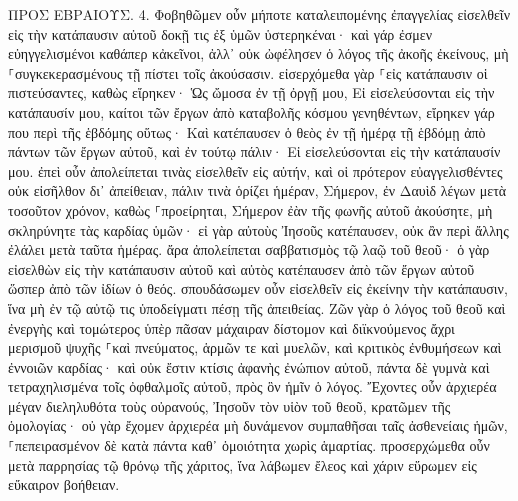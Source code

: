 \documentclass[twoside, 9pt]{extreport}
\begin{document}
ΠΡΟΣ ΕΒΡΑΙΟΥΣ.
4.
Φοβηθῶμεν οὖν μήποτε καταλειπομένης ἐπαγγελίας εἰσελθεῖν εἰς τὴν κατάπαυσιν αὐτοῦ δοκῇ τις ἐξ ὑμῶν ὑστερηκέναι· 
καὶ γάρ ἐσμεν εὐηγγελισμένοι καθάπερ κἀκεῖνοι, ἀλλ᾽ οὐκ ὠφέλησεν ὁ λόγος τῆς ἀκοῆς ἐκείνους, μὴ ⸀συγκεκερασμένους τῇ πίστει τοῖς ἀκούσασιν. 
εἰσερχόμεθα γὰρ ⸀εἰς κατάπαυσιν οἱ πιστεύσαντες, καθὼς εἴρηκεν· Ὡς ὤμοσα ἐν τῇ ὀργῇ μου, Εἰ εἰσελεύσονται εἰς τὴν κατάπαυσίν μου, καίτοι τῶν ἔργων ἀπὸ καταβολῆς κόσμου γενηθέντων, 
εἴρηκεν γάρ που περὶ τῆς ἑβδόμης οὕτως· Καὶ κατέπαυσεν ὁ θεὸς ἐν τῇ ἡμέρᾳ τῇ ἑβδόμῃ ἀπὸ πάντων τῶν ἔργων αὐτοῦ, 
καὶ ἐν τούτῳ πάλιν· Εἰ εἰσελεύσονται εἰς τὴν κατάπαυσίν μου. 
ἐπεὶ οὖν ἀπολείπεται τινὰς εἰσελθεῖν εἰς αὐτήν, καὶ οἱ πρότερον εὐαγγελισθέντες οὐκ εἰσῆλθον δι᾽ ἀπείθειαν, 
πάλιν τινὰ ὁρίζει ἡμέραν, Σήμερον, ἐν Δαυὶδ λέγων μετὰ τοσοῦτον χρόνον, καθὼς ⸀προείρηται, Σήμερον ἐὰν τῆς φωνῆς αὐτοῦ ἀκούσητε, μὴ σκληρύνητε τὰς καρδίας ὑμῶν· 
εἰ γὰρ αὐτοὺς Ἰησοῦς κατέπαυσεν, οὐκ ἂν περὶ ἄλλης ἐλάλει μετὰ ταῦτα ἡμέρας. 
ἄρα ἀπολείπεται σαββατισμὸς τῷ λαῷ τοῦ θεοῦ· 
ὁ γὰρ εἰσελθὼν εἰς τὴν κατάπαυσιν αὐτοῦ καὶ αὐτὸς κατέπαυσεν ἀπὸ τῶν ἔργων αὐτοῦ ὥσπερ ἀπὸ τῶν ἰδίων ὁ θεός. 
σπουδάσωμεν οὖν εἰσελθεῖν εἰς ἐκείνην τὴν κατάπαυσιν, ἵνα μὴ ἐν τῷ αὐτῷ τις ὑποδείγματι πέσῃ τῆς ἀπειθείας. 
Ζῶν γὰρ ὁ λόγος τοῦ θεοῦ καὶ ἐνεργὴς καὶ τομώτερος ὑπὲρ πᾶσαν μάχαιραν δίστομον καὶ διϊκνούμενος ἄχρι μερισμοῦ ψυχῆς ⸀καὶ πνεύματος, ἁρμῶν τε καὶ μυελῶν, καὶ κριτικὸς ἐνθυμήσεων καὶ ἐννοιῶν καρδίας· 
καὶ οὐκ ἔστιν κτίσις ἀφανὴς ἐνώπιον αὐτοῦ, πάντα δὲ γυμνὰ καὶ τετραχηλισμένα τοῖς ὀφθαλμοῖς αὐτοῦ, πρὸς ὃν ἡμῖν ὁ λόγος. 
Ἔχοντες οὖν ἀρχιερέα μέγαν διεληλυθότα τοὺς οὐρανούς, Ἰησοῦν τὸν υἱὸν τοῦ θεοῦ, κρατῶμεν τῆς ὁμολογίας· 
οὐ γὰρ ἔχομεν ἀρχιερέα μὴ δυνάμενον συμπαθῆσαι ταῖς ἀσθενείαις ἡμῶν, ⸀πεπειρασμένον δὲ κατὰ πάντα καθ᾽ ὁμοιότητα χωρὶς ἁμαρτίας. 
προσερχώμεθα οὖν μετὰ παρρησίας τῷ θρόνῳ τῆς χάριτος, ἵνα λάβωμεν ἔλεος καὶ χάριν εὕρωμεν εἰς εὔκαιρον βοήθειαν. 
\end{document}
